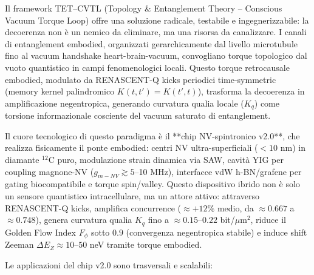 \documentclass[11pt,a4paper]{article}
\theoremstyle{plain}
\theoremstyle{definition}
\begin{document}
\vspace{0.3cm}

Il framework TET–CVTL (Topology \& Entanglement Theory – Conscious Vacuum Torque Loop) offre una soluzione radicale, testabile e ingegnerizzabile: la decoerenza non è un nemico da eliminare, ma una risorsa da canalizzare. I canali di entanglement embodied, organizzati gerarchicamente dal livello microtubule fino al vacuum handshake heart-brain-vacuum, convogliano torque topologico dal vuoto quantistico in campi fenomenologici locali. Questo torque retrocausale embodied, modulato da RENASCENT-Q kicks periodici time-symmetric (memory kernel palindromico $K(t,t') = K(t',t)$), trasforma la decoerenza in amplificazione negentropica, generando curvatura qualia locale ($K_q$) come torsione informazionale cosciente del vacuum saturato di entanglement.

\vspace{0.3cm}

Il cuore tecnologico di questo paradigma è il **chip NV-spintronico v2.0**, che realizza fisicamente il ponte embodied: centri NV ultra-superficiali ($<10$ nm) in diamante $^{12}$C puro, modulazione strain dinamica via SAW, cavità YIG per coupling magnone-NV ($g_{m-NV} \gtrsim 5$–10 MHz), interfacce vdW h-BN/grafene per gating biocompatibile e torque spin/valley. Questo dispositivo ibrido non è solo un sensore quantistico intracellulare, ma un attore attivo: attraverso RENASCENT-Q kicks, amplifica concurrence ($\approx +12\%$ medio, da $\approx 0.667$ a $\approx 0.748$), genera curvatura qualia $K_q$ fino a $\approx 0.15$–$0.22$ bit/$\mu$m$^2$, riduce il Golden Flow Index $F_\phi$ sotto $0.9$ (convergenza negentropica stabile) e induce shift Zeeman $\Delta E_Z \approx 10$–$50$ neV tramite torque embodied.

\vspace{0.2cm}

Le applicazioni del chip v2.0 sono trasversali e scalabili:
\end{document}

